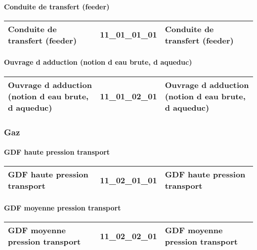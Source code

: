 \documentclass[12pt,titlepage]{book}
\begin{document}
\paragraph{Conduite de transfert (feeder)}
\noindent
\vspace{\baselineskip}

\renewcommand{\arraystretch}{1.2}
\begin{supertabular}{|p{10cm}|c|p{15cm}|}
 Conduite de transfert (feeder) & 11\_01\_01\_01 & Conduite de transfert (feeder)\\
\hline
\end{supertabular}


\paragraph{Ouvrage d adduction (notion d eau brute, d aqueduc)}
\noindent
\vspace{\baselineskip}

\renewcommand{\arraystretch}{1.2}
\begin{supertabular}{|p{10cm}|c|p{15cm}|}
 Ouvrage d adduction (notion d eau brute, d aqueduc) & 11\_01\_02\_01 & Ouvrage d adduction (notion d eau brute, d aqueduc)\\
\hline
\end{supertabular}

\subsubsection{\large Gaz}
\paragraph{GDF haute pression transport}
\noindent
\vspace{\baselineskip}

\renewcommand{\arraystretch}{1.2}
\begin{supertabular}{|p{10cm}|c|p{15cm}|}
 GDF haute pression transport & 11\_02\_01\_01 & GDF haute pression transport\\
\hline
\end{supertabular}


\paragraph{GDF moyenne pression transport}
\noindent
\vspace{\baselineskip}

\renewcommand{\arraystretch}{1.2}
\begin{supertabular}{|p{10cm}|c|p{15cm}|}
 GDF moyenne pression transport & 11\_02\_02\_01 & GDF moyenne pression transport\\
\hline
\end{supertabular}
\end{document}

